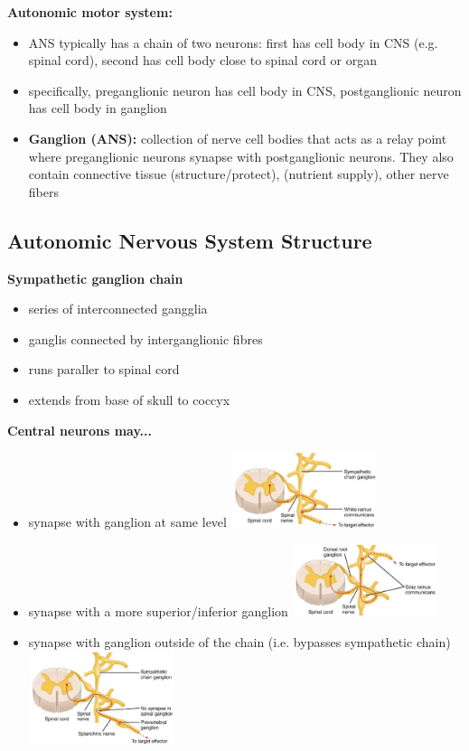 \documentclass[11pt,fleqn]{book} %
\begin{document}
\textbf{Autonomic motor system:} 
\begin{itemize}
    \item ANS typically has a chain of two neurons: first has cell body in CNS (e.g. spinal cord), second has cell body close to spinal cord or organ
    \item specifically, preganglionic neuron has cell body in CNS, postganglionic neuron has cell body in ganglion
    \item \textbf{Ganglion (ANS):} collection of nerve cell bodies that acts as a relay point where preganglionic neurons synapse with postganglionic neurons. They also contain connective tissue (structure/protect), (nutrient supply), other nerve fibers
\end{itemize}

\subsection{Autonomic Nervous System Structure}
\textbf{Sympathetic ganglion chain}
\begin{itemize}
    \item series of interconnected gangglia
    \item ganglis connected by interganglionic fibres
    \item runs paraller to spinal cord
    \item extends from base of skull to coccyx
\end{itemize}

\textbf{Central neurons may...}
\begin{itemize}
    \item synapse with ganglion at same level \includegraphics[width=120pt]{Pictures/Screenshot 2024-03-06 202747.png}
    \item synapse with a more superior/inferior ganglion \includegraphics[width=120pt]{Pictures/Screenshot 2024-03-06 202752.png}
    \item synapse with ganglion outside of the chain (i.e. bypasses sympathetic chain) \includegraphics[width=120pt]{Pictures/Screenshot 2024-03-06 202757.png}
\end{itemize}
\end{document}
